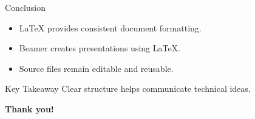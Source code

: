\documentclass[aspectratio=169]{beamer}
\begin{document}
\begin{frame}{Conclusion}
    \begin{itemize}
        \item LaTeX provides consistent document formatting.
        \item Beamer creates presentations using LaTeX.
        \item Source files remain editable and reusable.
    \end{itemize}

    \begin{exampleblock}{Key Takeaway}
        Clear structure helps communicate technical ideas.
    \end{exampleblock}

    \vfill
    \centering
    \textbf{Thank you!}
\end{frame}
\end{document}
